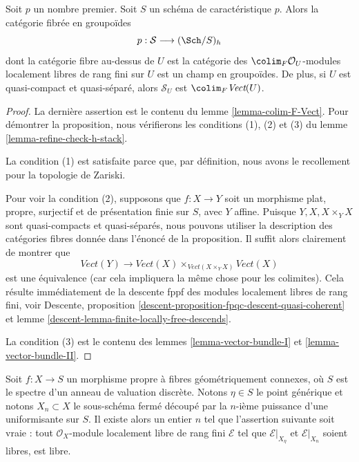 \begin{proposition}
\label{proposition-h-descent-vector-bundles-p}
Soit $p$ un nombre premier. Soit $S$ un schéma de caractéristique $p$.
Alors la catégorie fibrée en groupoïdes
$$
p : \mathcal{S} \longrightarrow (\Sch/S)_h
$$
dont la catégorie fibre au-dessus de $U$ est la catégorie
des $\colim_F \mathcal{O}_U$-modules localement libres de rang fini sur $U$
est un champ en groupoïdes. De plus, si $U$ est quasi-compact
et quasi-séparé, alors $\mathcal{S}_U$ est $\colim_F \textit{Vect}(U)$.
\end{proposition}

\begin{proof}
La dernière assertion est le contenu du lemme \ref{lemma-colim-F-Vect}.
Pour démontrer la proposition, nous vérifierons les conditions (1), (2) et (3) du
lemme \ref{lemma-refine-check-h-stack}.

\medskip\noindent
La condition (1) est satisfaite parce que, par définition, nous avons le recollement
pour la topologie de Zariski.

\medskip\noindent
Pour voir la condition (2), supposons que $f : X \to Y$ soit un morphisme
plat, propre, surjectif et de présentation finie sur $S$, avec $Y$ affine.
Puisque $Y, X, X \times_Y X$ sont quasi-compacts et quasi-séparés,
nous pouvons utiliser la description des catégories fibres donnée dans
l'énoncé de la proposition. Il suffit alors clairement de
montrer que
$$
\textit{Vect}(Y)
\longrightarrow
\textit{Vect}(X)
\times_{\textit{Vect}(X \times_Y X)}
\textit{Vect}(X)
$$
est une équivalence (car cela impliquera la même chose pour les colimites).
Cela résulte immédiatement de la descente fppf des modules localement libres de rang fini, voir
Descente, proposition \ref{descent-proposition-fpqc-descent-quasi-coherent} et
lemme \ref{descent-lemma-finite-locally-free-descends}.

\medskip\noindent
La condition (3) est le contenu des
lemmes \ref{lemma-vector-bundle-I} et \ref{lemma-vector-bundle-II}.
\end{proof}

\begin{lemma}
\label{lemma-trivial-fibres-dvr}
Soit $f : X \to S$ un morphisme propre à fibres géométriquement connexes,
où $S$ est le spectre d'un anneau de valuation discrète. Notons $\eta \in S$
le point générique et notons $X_n \subset X$ le sous-schéma fermé
découpé par la $n$-ième puissance d'une uniformisante sur $S$.
Il existe alors
un entier $n$ tel que l'assertion suivante soit vraie : tout
$\mathcal{O}_X$-module localement libre de rang fini $\mathcal{E}$
tel que $\mathcal{E}|_{X_\eta}$ et $\mathcal{E}|_{X_n}$
soient libres, est libre.
\end{lemma}

